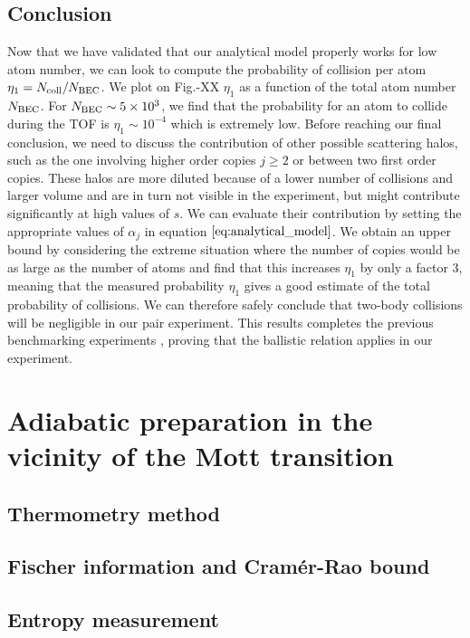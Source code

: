 \subsection{Conclusion}

Now that we have validated that our analytical model properly works for low atom number, we can look to compute the probability of collision per atom $\eta_1 = N_{\rm{coll}}/N_{\rm{BEC}}$. We plot on Fig.-XX $\eta_1$ as a function of the total atom number $N_{\rm{BEC}}$. For $N_{\rm{BEC}} \sim 5 \times 10^3$, we find that the probability for an atom to collide during the TOF is $\eta_1 \sim 10^{-4}$ which is extremely low. Before reaching our final conclusion, we need to discuss the contribution of other possible scattering halos, such as the one involving higher order copies $j \geq 2$ or between two first order copies. These halos are more diluted because of a lower number of collisions and larger volume and are in turn not visible in the experiment, but might contribute significantly at high values of $s$. We can evaluate their contribution by setting the appropriate values of $\alpha_j$ in equation $\ref{eq:analytical_model}$. We obtain an upper bound by considering the extreme situation where the number of copies would be as large as the number of atoms and find that this increases $\eta_1$ by only a factor 3, meaning that the measured probability $\eta_1$ gives a good estimate of the total probability of collisions. We can therefore safely conclude that two-body collisions will be negligible in our \kmk pair experiment. This results completes the previous benchmarking experiments \cite{cayla2018single}, proving that the ballistic relation applies in our experiment.

\section{Adiabatic preparation in the vicinity of the Mott transition}


\subsection{Thermometry method}

\subsection{Fischer information and Cramér-Rao bound}

\subsection{Entropy measurement}
